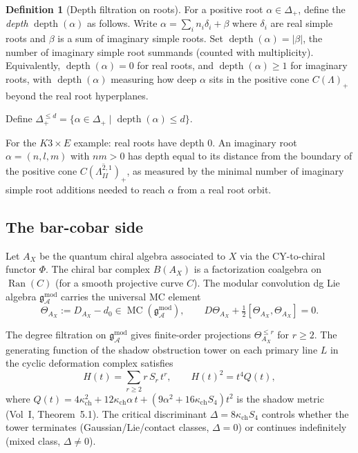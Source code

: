 \documentclass[11pt]{amsart}
\theoremstyle{definition}
\newtheorem{definition}[theorem]{Definition}
\theoremstyle{remark}
\DeclareMathOperator{\Ran}{Ran}
\DeclareMathOperator{\MC}{MC}
\DeclareMathOperator{\depth}{depth}
\newcommand{\cA}{\mathcal{A}}
\newcommand{\gmod}{\mathfrak{g}^{\mathrm{mod}}_\cA}
\begin{document}
\begin{definition}[Depth filtration on roots]
\label{def:root-depth}
For a positive root $\alpha \in \Delta_+$, define the
\emph{depth} $\depth(\alpha)$ as follows. Write
$\alpha = \sum_i n_i \delta_i + \beta$ where $\delta_i$ are
real simple roots and $\beta$ is a sum of imaginary simple roots.
Set $\depth(\alpha) = |\beta|$, the number of imaginary simple
root summands (counted with multiplicity). Equivalently,
$\depth(\alpha) = 0$ for real roots, and
$\depth(\alpha) \geq 1$ for imaginary roots, with
$\depth(\alpha)$ measuring how deep $\alpha$ sits in the
positive cone $C(\Lambda)_+$ beyond the real root hyperplanes.

Define $\Delta^{\leq d}_+ = \{\alpha \in \Delta_+ \mid
\depth(\alpha) \leq d\}$.
\end{definition}

For the $K3 \times E$ example: real roots have depth $0$.
An imaginary root $\alpha = (n, l, m)$ with $nm > 0$ has depth
equal to its distance from the boundary of the positive cone
$\overline{C(\Lambda^{2,1}_{II})_+}$, as measured by the
minimal number of imaginary simple root additions needed to
reach $\alpha$ from a real root orbit.

\subsection{The bar-cobar side}

Let $A_X$ be the quantum chiral algebra associated to $X$ via
the CY-to-chiral functor $\Phi$. The chiral bar complex
$B(A_X)$ is a factorization coalgebra on $\Ran(C)$ (for a
smooth projective curve $C$). The modular convolution dg
Lie algebra $\gmod$ carries the universal MC element
\begin{equation}\label{eq:mc-element}
 \Theta_{A_X} := D_{A_X} - d_0 \in \MC(\gmod),
 \qquad
 D\Theta_{A_X} + \tfrac{1}{2}[\Theta_{A_X}, \Theta_{A_X}] = 0.
\end{equation}

The degree filtration on $\gmod$ gives finite-order projections
$\Theta_{A_X}^{\leq r}$ for $r \geq 2$. The generating function
of the shadow obstruction tower on each primary line $L$ in the cyclic
deformation complex satisfies
\[
 H(t) = \sum_{r \geq 2} r\, S_r\, t^r, \qquad
 H(t)^2 = t^4 Q(t),
\]
where $Q(t) = 4\kappa_{\mathrm{ch}}^2 + 12\kappa_{\mathrm{ch}}\alpha\, t +
(9\alpha^2 + 16\kappa_{\mathrm{ch}} S_4) t^2$ is the shadow metric (Vol~I,
Theorem~5.1). The critical discriminant
$\Delta = 8\kappa_{\mathrm{ch}} S_4$ controls whether the tower terminates
(Gaussian/Lie/contact classes, $\Delta = 0$) or continues
indefinitely (mixed class, $\Delta \neq 0$).
\end{document}
